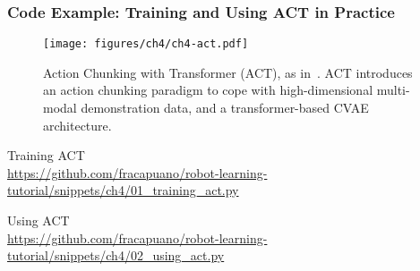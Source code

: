 \subsubsection{Code Example: Training and Using ACT in Practice}

\begin{figure}
    \centering
    \texttt{[image: figures/ch4/ch4-act.pdf]}
    \caption{Action Chunking with Transformer (ACT), as in~\citet{zhaoLearningFineGrainedBimanual2023}. ACT introduces an action chunking paradigm to cope with high-dimensional multi-modal demonstration data, and a transformer-based CVAE architecture.}
    \label{fig:ch4-act}
\end{figure}

\begin{pbox}[label={ex:act_training}]{Training ACT \\ \url{https://github.com/fracapuano/robot-learning-tutorial/snippets/ch4/01_training_act.py}}
    
\end{pbox}

\begin{pbox}[label={ex:act_using}]{Using ACT \\ \url{https://github.com/fracapuano/robot-learning-tutorial/snippets/ch4/02_using_act.py}}
    
\end{pbox}

